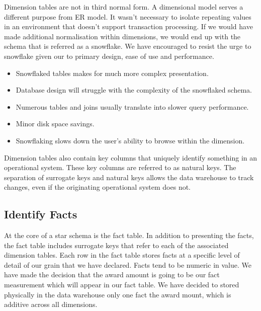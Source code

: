 \documentclass[letterpaper,12pt,oneside]{sphinxmanual}
\begin{document}
Dimension tables are not in third normal form. A dimensional model serves a different purpose from ER model.
It wasn’t necessary to isolate repeating values in an environment that doesn't support transaction processing.
If we would have made additional normalisation within dimensions, we would end up with the schema that is referred as a snowflake.
We have encouraged to resist the urge to snowflake given our to primary design, ease of use and performance.
\begin{itemize}
\item {} 
Snowflaked tables makes for much more complex presentation.

\item {} 
Database design will struggle with the complexity of the snowflaked schema.

\item {} 
Numerous tables and joins usually translate into slower query performance.

\item {} 
Minor disk space savings.

\item {} 
Snowflaking slows down the user’s ability to browse within the dimension.

\end{itemize}

Dimension tables also contain key columns that uniquely identify something in an operational system.
These key columns are referred to as natural keys. The separation of surrogate keys and natural keys
allows the data warehouse to track changes, even if the originating operational system does not.


\subsection{Identify Facts}
\label{datawarehouse:identify-facts}
At the core of a star schema is the fact table. In addition to presenting the facts, the fact table includes surrogate
keys that refer to each of the associated dimension tables. Each row in the fact table stores facts at a specific
level of detail of our grain that we have declared. Facts tend to be numeric in value. We have made the decision
that the award amount is going to be our fact measurement which will appear in our fact table. We have decided
to stored physically in the data warehouse only one fact the award mount, which is additive across all dimensions.
\end{document}
